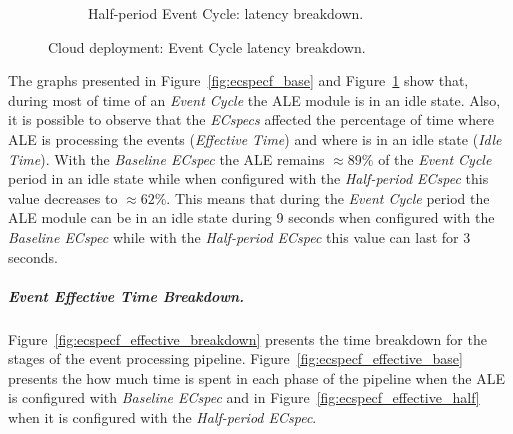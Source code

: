 \begin{figure}[ht!]
\begin{subfigure}{.5\textwidth}
      \caption{Half-period Event Cycle: latency breakdown.}
      \label{fig:ecspecf_half}
    \end{subfigure}
    \caption[Cloud deployment: event latency breakdown.]{Cloud deployment: Event Cycle latency breakdown.}
    \label{fig:ecspecf_breakdown}
  \end{figure}

  The graphs presented in Figure~\ref{fig:ecspecf_base} and Figure~\ref{fig:ecspecf_half} show that,
  during most of time of an \textit{Event Cycle} the \gls{ALE} module is in an idle state.
  Also, it is possible to observe that the \textit{ECspecs} affected the percentage of time where
  \gls{ALE} is processing the events (\textit{Effective Time}) and where is in an idle state (\textit{Idle Time}).
  With the \textit{Baseline ECspec} the \gls{ALE} remains $\approx89\%$ of the \textit{Event Cycle} period
  in an idle state while when configured with the \textit{Half-period ECspec} this value decreases to
  $\approx62\%$. This means that during the \textit{Event Cycle} period the \gls{ALE} module can be in
  an idle state during 9 seconds when configured with the \textit{Baseline ECspec} while with the
  \textit{Half-period ECspec} this value can last for 3 seconds.

  \subparagraph{Event Effective Time Breakdown.}
  \label{subp:cloud_event_effective_breakdown}
  Figure~\ref{fig:ecspecf_effective_breakdown} presents the time breakdown for the stages of the
  event processing pipeline. Figure~\ref{fig:ecspecf_effective_base} presents the how much time is spent
  in each phase of the pipeline when the \gls{ALE} is configured with \textit{Baseline ECspec} and in
  Figure~\ref{fig:ecspecf_effective_half} when it is configured with the \textit{Half-period ECspec}.\\

